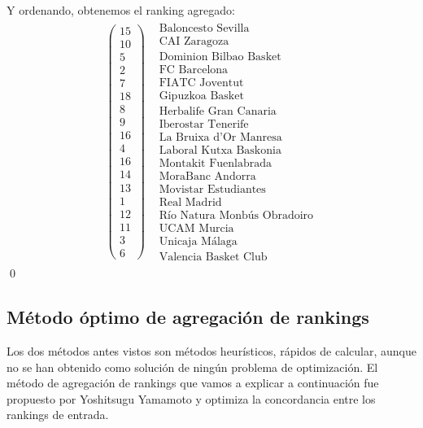 Y ordenando, obtenemos el ranking agregado:\\
\[
\begin{array}{cc}
\left(\begin{array}{c}
15\\
10\\
5\\
2\\
7\\
18\\
8\\
9\\
16\\
4\\
16\\
14\\
13\\
1\\
12\\
11\\
3\\
6
\end{array} \right) & \begin{array}{c}
\text{Baloncesto Sevilla}\\
\text{CAI Zaragoza} \\
\text{Dominion Bilbao Basket} \\
\text{FC Barcelona} \\
\text{FIATC Joventut} \\
\text{Gipuzkoa Basket} \\
\text{Herbalife Gran Canaria} \\
\text{Iberostar Tenerife} \\
\text{La Bruixa d'Or Manresa} \\
\text{Laboral Kutxa Baskonia} \\
\text{Montakit Fuenlabrada} \\
\text{MoraBanc Andorra} \\
\text{Movistar Estudiantes} \\
\text{Real Madrid} \\
\text{Río Natura Monbús Obradoiro} \\
\text{UCAM Murcia} \\
\text{Unicaja Málaga} \\
\text{Valencia Basket Club}
\end{array} 
\end{array} 
\]
\qed


\subsection{Método óptimo de agregación de rankings}
Los dos métodos antes vistos son métodos heurísticos, rápidos de calcular, aunque no se han obtenido como solución de ningún problema de optimización. El método de agregación de rankings que vamos a explicar a continuación fue propuesto por Yoshitsugu Yamamoto y optimiza la concordancia entre los rankings de entrada.\\

